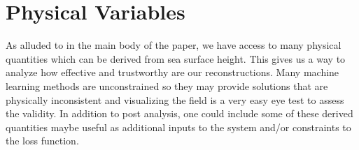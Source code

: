 \section{Physical Variables} \label{sec:physical_variables}

As alluded to in the main body of the paper, we have access to many physical quantities which can be derived from  sea surface height. 
This gives us a way to analyze how effective and trustworthy are our reconstructions. 
Many machine learning methods are unconstrained so they may provide solutions that are physically inconsistent and visualizing the field is a very easy eye test to assess the validity. 
In addition to post analysis, one could include some of these derived quantities maybe useful as additional inputs to the system and/or constraints to the loss function. 






